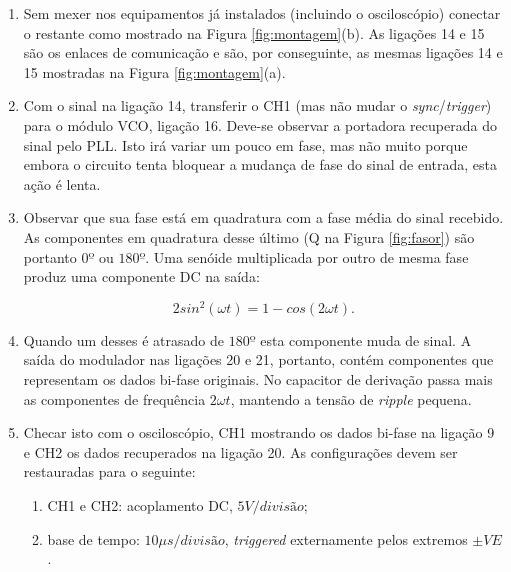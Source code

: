         \begin{enumerate}
            \item Sem mexer nos equipamentos já instalados (incluindo o osciloscópio) conectar o restante como mostrado na Figura \ref{fig:montagem}(b). As ligações 14 e 15 são os enlaces de comunicação e são, por conseguinte, as mesmas ligações 14 e 15 mostradas na Figura \ref{fig:montagem}(a).
            
            \item Com o sinal na ligação 14, transferir o CH1 (mas não mudar o \textit{sync}/\textit{trigger}) para o módulo VCO, ligação 16. Deve-se observar a portadora recuperada do sinal pelo PLL. Isto irá variar um pouco em fase, mas não muito porque embora o circuito tenta bloquear a mudança de fase do sinal de entrada, esta ação é lenta.
            
            \item Observar que sua fase está em quadratura com a fase média do sinal recebido. As componentes em quadratura desse último (Q na Figura \ref{fig:fasor}) são portanto $0º$ ou $180º$. Uma senóide multiplicada por outro de mesma fase produz uma componente DC na saída:
            
            \begin{equation}
	            2sin^2(\omega t) = 1 - cos(2 \omega t).
            \end{equation}
            
            \item Quando um desses é atrasado de $180º$ esta componente muda de sinal. A saída do modulador nas ligações 20 e 21, portanto, contém componentes que representam os dados bi-fase originais. No capacitor de derivação passa mais as componentes de frequência $2 \omega t$, mantendo a tensão de \textit{ripple} pequena.
            
            \item Checar isto com o osciloscópio, CH1 mostrando os dados bi-fase na ligação 9 e CH2 os dados recuperados na ligação 20. As configurações devem ser restauradas para o seguinte:
	        \begin{enumerate}
	            \item CH1 e CH2: acoplamento DC, $5V/divisão$;
	            	
	            \item base de tempo: $10 \mu s/divisão$, \textit{triggered} externamente pelos extremos $\pm V E$.
	        \end{enumerate}


\end{enumerate}
